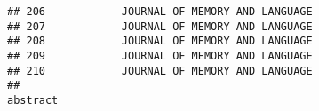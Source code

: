\documentclass[
  english,
  man]{apa6}
\begin{document}
\begin{verbatim}
## 206            JOURNAL OF MEMORY AND LANGUAGE
## 207            JOURNAL OF MEMORY AND LANGUAGE
## 208            JOURNAL OF MEMORY AND LANGUAGE
## 209            JOURNAL OF MEMORY AND LANGUAGE
## 210            JOURNAL OF MEMORY AND LANGUAGE
##                                                                                                                                                                                                                                                                                                                                                                                                                                                                                                                                                                                                                                                                                                                                                                                                                                                                                                                                                                                                                                                                                                                                                                                                                                                                                                                                                                                                                                                                                                                                                                                                                                                                                                                                                                                                                                                                                                                                                                                                                                                                                                                                                                                                                                                                                                                                                                                                                                                                                                                                                                                                                                                                     abstract

\end{verbatim}
\end{document}
